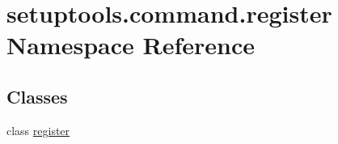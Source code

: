 \hypertarget{namespacesetuptools_1_1command_1_1register}{}\section{setuptools.\+command.\+register Namespace Reference}
\label{namespacesetuptools_1_1command_1_1register}
\subsection*{Classes}
\begin{DoxyCompactItemize}
\item 
class \hyperlink{classsetuptools_1_1command_1_1register_1_1register}{register}
\end{DoxyCompactItemize}
